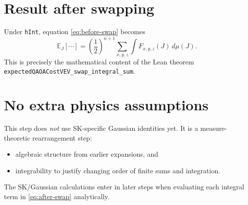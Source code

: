 \documentclass[11pt]{article}
\begin{document}
	\section*{Result after swapping}
	Under \texttt{hInt}, equation \eqref{eq:before-swap} becomes
	\begin{equation}
		\mathbb{E}_{J}[\cdots]
		=
		\left(\frac12\right)^{n+1}
		\sum_{x,y,z}
		\int F_{x,y,z}(J)\,d\mu(J).
		\label{eq:after-swap}
	\end{equation}
	This is precisely the mathematical content of the Lean theorem
	\texttt{expectedQAOACostVEV\_swap\_integral\_sum}.
	
	\section*{No extra physics assumptions}
	This step does \emph{not} use SK-specific Gaussian identities yet. It is a measure-theoretic rearrangement step:
	\begin{itemize}
		\item algebraic structure from earlier expansions, and
		\item integrability to justify changing order of finite sums and integration.
	\end{itemize}
	The SK/Gaussian calculations enter in later steps when evaluating each integral term in \eqref{eq:after-swap} analytically.
	
\end{document}
